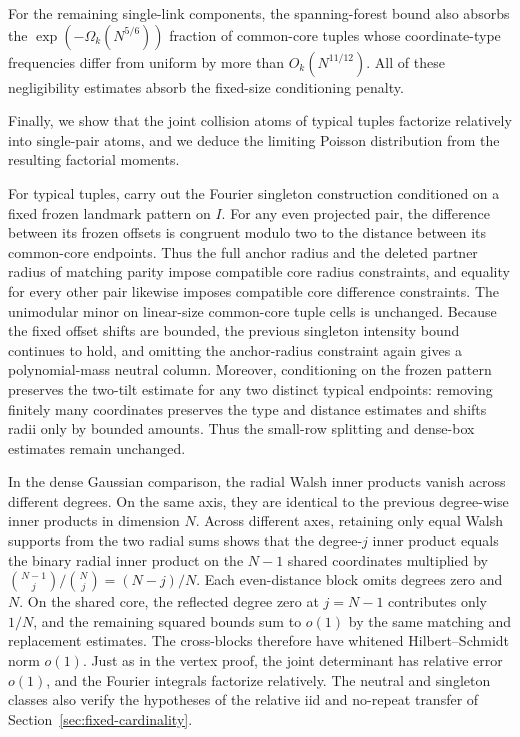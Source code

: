 For the remaining single-link components, the spanning-forest bound also absorbs the \(\exp(-\Omega_k(N^{5/6}))\) fraction of common-core tuples whose coordinate-type frequencies differ from uniform by more than \(O_k(N^{11/12})\). All of these negligibility estimates absorb the fixed-size conditioning penalty.

Finally, we show that the joint collision atoms of typical tuples factorize relatively into single-pair atoms, and we deduce the limiting Poisson distribution from the resulting factorial moments.

For typical tuples, carry out the Fourier singleton construction conditioned on a fixed frozen landmark pattern on \(I\). For any even projected pair, the difference between its frozen offsets is congruent modulo two to the distance between its common-core endpoints. Thus the full anchor radius and the deleted partner radius of matching parity impose compatible core radius constraints, and equality for every other pair likewise imposes compatible core difference constraints. The unimodular minor on linear-size common-core tuple cells is unchanged. Because the fixed offset shifts are bounded, the previous singleton intensity bound continues to hold, and omitting the anchor-radius constraint again gives a polynomial-mass neutral column. Moreover, conditioning on the frozen pattern preserves the two-tilt estimate for any two distinct typical endpoints: removing finitely many coordinates preserves the type and distance estimates and shifts radii only by bounded amounts. Thus the small-row splitting and dense-box estimates remain unchanged.

In the dense Gaussian comparison, the radial Walsh inner products vanish across different degrees. On the same axis, they are identical to the previous degree-wise inner products in dimension \(N\). Across different axes, retaining only equal Walsh supports from the two radial sums shows that the degree-\(j\) inner product equals the binary radial inner product on the \(N-1\) shared coordinates multiplied by \(\binom{N-1}{j}/\binom Nj=(N-j)/N\). Each even-distance block omits degrees zero and \(N\). On the shared core, the reflected degree zero at \(j=N-1\) contributes only \(1/N\), and the remaining squared bounds sum to \(o(1)\) by the same matching and replacement estimates. The cross-blocks therefore have whitened Hilbert--Schmidt norm \(o(1)\). Just as in the vertex proof, the joint determinant has relative error \(o(1)\), and the Fourier integrals factorize relatively. The neutral and singleton classes also verify the hypotheses of the relative iid and no-repeat transfer of Section~\ref{sec:fixed-cardinality}.

